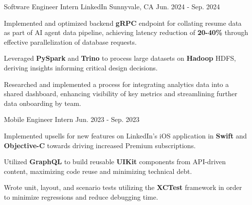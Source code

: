 

\begin{cventries}

\cventrytwo
  {Software Engineer Intern} %
  {LinkedIn} %
  {Sunnyvale, CA} %
  {Jun. 2024 - Sep. 2024} %
  {
    \begin{cvitems} %
      \item {Implemented and optimized backend \textbf{gRPC} endpoint for collating resume data as part of AI agent data pipeline, achieving latency reduction of \textbf{20-40\%} through effective parallelization of database requests.}
      \item {Leveraged \textbf{PySpark} and \textbf{Trino} to process large datasets on \textbf{Hadoop} HDFS, deriving insights informing critical design decisions.}
      \item {Researched and implemented a process for integrating analytics data into a shared dashboard, enhancing visibility of key metrics and streamlining further data onboarding by team.}
    \end{cvitems}
  }
  {Mobile Engineer Intern} %
  {Jun. 2023 - Sep. 2023} %
  {
    \begin{cvitems} %
      \item {Implemented upsells for new features on LinkedIn’s iOS application in \textbf{Swift} and \textbf{Objective-C} towards driving increased Premium subscriptions. }
      \item {Utilized \textbf{GraphQL} to build reusable \textbf{UIKit} components from API-driven content, maximizing code reuse and minimizing technical debt.}
      \item {Wrote unit, layout, and scenario tests utilizing the \textbf{XCTest} framework in order to minimize regressions and reduce debugging time.}
    \end{cvitems}
  } %



\end{cventries}
